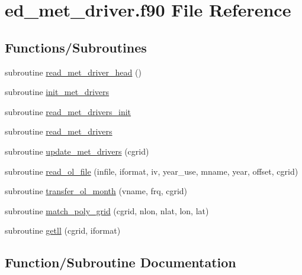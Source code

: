 \hypertarget{ed__met__driver_8f90}{}\section{ed\+\_\+met\+\_\+driver.\+f90 File Reference}
\label{ed__met__driver_8f90}
\subsection*{Functions/\+Subroutines}
\begin{DoxyCompactItemize}
\item 
subroutine \hyperlink{ed__met__driver_8f90_aaac32069d2a1755b7c28d9fb6dfa46b5}{read\+\_\+met\+\_\+driver\+\_\+head} ()
\item 
subroutine \hyperlink{ed__met__driver_8f90_af374ae80eae6cc36ba0b929cb3331dd6}{init\+\_\+met\+\_\+drivers}
\item 
subroutine \hyperlink{ed__met__driver_8f90_ae08362e245fc684cc25b6da9753d7e8d}{read\+\_\+met\+\_\+drivers\+\_\+init}
\item 
subroutine \hyperlink{ed__met__driver_8f90_a7d4297b01884de8f2e6600b55237abe3}{read\+\_\+met\+\_\+drivers}
\item 
subroutine \hyperlink{ed__met__driver_8f90_a733afbe45244033876caaa6e09cb053c}{update\+\_\+met\+\_\+drivers} (cgrid)
\item 
subroutine \hyperlink{ed__met__driver_8f90_a34eab0172f052f94967db76f5759f3af}{read\+\_\+ol\+\_\+file} (infile, iformat, iv, year\+\_\+use, mname, year, offset, cgrid)
\item 
subroutine \hyperlink{ed__met__driver_8f90_a82a398380568058329f47b2ef8c7687a}{transfer\+\_\+ol\+\_\+month} (vname, frq, cgrid)
\item 
subroutine \hyperlink{ed__met__driver_8f90_aaa95caccc923f7929434fdb91215b1d5}{match\+\_\+poly\+\_\+grid} (cgrid, nlon, nlat, lon, lat)
\item 
subroutine \hyperlink{ed__met__driver_8f90_ae10e80f54928f80aa87823047476779e}{getll} (cgrid, iformat)
\end{DoxyCompactItemize}


\subsection{Function/\+Subroutine Documentation}
\hypertarget{ed__met__driver_8f90_ae10e80f54928f80aa87823047476779e}{}
